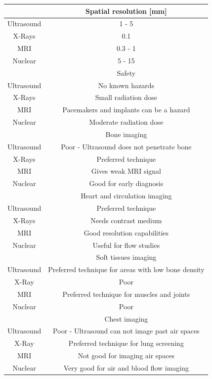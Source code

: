 \begin{table}[!ht]
\centering
\begin{tabular}{| c || c |}
 \hline\hline
    &   Spatial resolution [mm] \\
  \hline
  Ultrasound    &   1 - 5 \\
  X-Rays    &   0.1 \\
  MRI   &   0.3 - 1 \\
  Nuclear   &   5 - 15 \\
  
  \hline\hline
    &   Safety \\
  \hline
  Ultrasound    &   No known hazards \\
  X-Rays    &   Small radiation dose \\
  MRI   &   Pacemakers and implants can be a hazard \\
  Nuclear   &   Moderate radiation dose \\
  
  \hline\hline
    &   Bone imaging \\
  \hline
  Ultrasound    &  Poor - Ultrasound does not penetrate bone \\
  X-Rays    &   Preferred technique \\
  MRI   &   Gives weak MRI signal \\
  Nuclear   &   Good for early diagnosis \\
  
  \hline\hline
    &   Heart and circulation imaging \\
  \hline
  Ultrasound    &  Preferred technique \\
  X-Rays    &   Needs contrast medium \\
  MRI   &    Good resolution capabilities \\
  Nuclear   &   Useful for flow studies \\
  \hline\hline
  
    &   Soft tissues imaging    \\
  \hline
  Ultrasound    & Preferred technique for areas with low bone density \\
  X-Ray &   Poor \\
  MRI   &   Preferred technique for muscles and joints \\
  Nuclear   & Poor \\
  \hline\hline
  
    &   Chest imaging   \\
  \hline
  Ultrasound    & Poor - Ultrasound can not image past air spaces \\
  X-Ray & Preferred technique for lung screening \\
  MRI   & Not good for imaging air spaces \\
  Nuclear   & Very good for air and blood flow imaging \\
  

\end{tabular}
\end{table}
